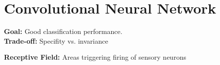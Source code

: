 \section{Convolutional Neural Network}
\textbf{Goal:} Good classification performance.\\
\textbf{Trade-off:} Specifity vs. invariance\\

\textbf{Receptive Field:}  Areas triggering firing of sensory neurons\\

